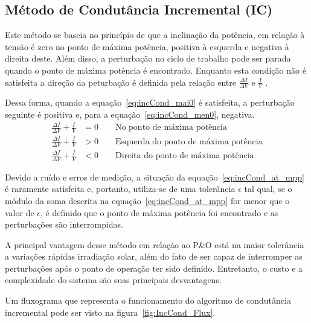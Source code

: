 \documentclass[
	12pt,				%
	openright,			%
	onseside,
	a4paper,			%
	english,			%
	french,				%
	spanish,			%
	brazil,				%
	]{abntex2}
\begin{document}
\subsection{Método de Condutância Incremental (IC)}

Este método se baseia no princípio de que a inclinação da potência, em relação à tensão é zero no ponto de máxima potência, positiva à esquerda e negativa à direita deste. Além disso, a perturbação no ciclo de trabalho pode ser parada quando o ponto de máxima potência é encontrado. Enquanto esta condição não é satisfeita a direção da peturbação é definida pela relação entre $\frac{\Delta I}{\Delta V}$ e $\frac{I}{V}$ \cite{Talha_MPPT}\cite{MPPT_P&O_IC}.

Dessa forma, quando a equação~\ref{eq:incCond_mai0} é satisfeita, a perturbação seguinte é positiva e, para a equação~\ref{eq:incCond_men0}, negativa.
\begin{align}
	\frac{\Delta I}{\Delta V} + \frac{I}{V} &= 0 \qquad \text{No ponto de máxima potência} \label{eq:incCond_at_mpp}\\
	\frac{\Delta I}{\Delta V} + \frac{I}{V} &> 0 \qquad \text{Esquerda do ponto de máxima potência} \label{eq:incCond_mai0}\\
	\frac{\Delta I}{\Delta V} + \frac{I}{V} &< 0 \qquad \text{Direita do ponto de máxima potência} \label{eq:incCond_men0}
\end{align}

Devido a ruído e erros de medição, a situação da equação~\ref{eq:incCond_at_mpp} é raramente satisfeita e, portanto, utiliza-se de uma tolerância $\epsilon$ tal qual, se o módulo da soma descrita na equação~\ref{eq:incCond_at_mpp} for menor que o valor de $\epsilon$, é definido que o ponto de máxima potência foi encontrado e as perturbações são interrompidas\cite{Talha_MPPT}.

A principal vantagem desse método em relação ao P\&O está na maior tolerância a variações rápidas irradiação solar, além do fato de ser capaz de interromper as perturbações após o ponto de operação ter sido definido. Entretanto, o custo e a complexidade do sistema são suas principais desvantagens\cite{MPPT_P&O_IC}.

Um fluxograma que representa o funcionamento do algoritmo de condutância incremental pode ser visto na figura~\ref{fig:IncCond_Flux}.
\end{document}
